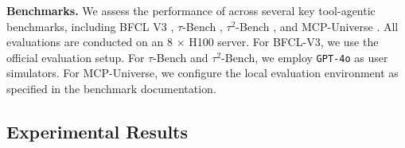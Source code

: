 \textbf{Benchmarks.} We assess the performance of \dataname across several key tool-agentic benchmarks, including BFCL V3 \cite{patil2025bfcl}, $\tau$-Bench \cite{yao2024taubenchbenchmarktoolagentuserinteraction}, $\tau^2$-Bench \citep{barres2025tau2benchevaluatingconversationalagents}, and MCP-Universe \cite{mcpuniverse}. All evaluations are conducted on an 8 $\times$ H100 server. For BFCL-V3, we use the official evaluation setup. For $\tau$-Bench and $\tau^2$-Bench, we employ \texttt{GPT-4o} as user simulators. For MCP-Universe, we configure the local evaluation environment as specified in the benchmark documentation.

\subsection{Experimental Results}

